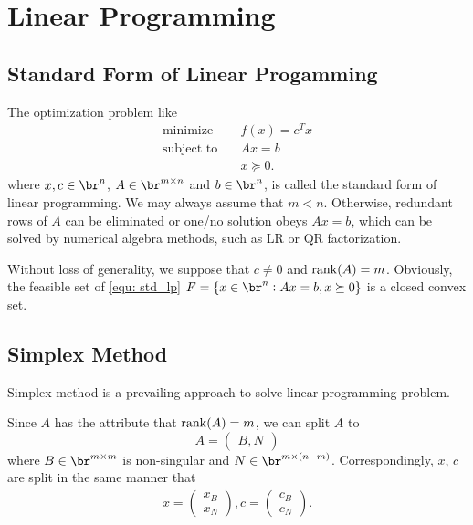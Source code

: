 \chapter{Linear Programming}
\section{Standard Form of Linear Progamming}
The optimization problem like 
\begin{equation}
    \label{equ: std_lp}
    \begin{aligned}
        \text{minimize} \quad & f(x) = c^Tx \\
        \text{subject to} \quad & Ax=b \\
        & x \succeq 0.
    \end{aligned}
\end{equation}
where $x, c \in \br ^n$, $A \in \br^{m \times n}$ and $b \in \br^n$, is 
called the standard form of linear programming. We may always assume that 
$m < n$. Otherwise, redundant rows of $A$ can be eliminated or one/no 
solution obeys $Ax = b$, which can be solved by numerical algebra methods, 
such as LR or QR factorization. 

Without loss of generality, we suppose that $c \ne 0$ and $\operatorname{rank}(A) = m$.
Obviously, the feasible set of \ref{equ: std_lp} $F=\{x \in \br^n : 
Ax = b, x \succeq 0\}$ is a closed convex set. 

\section{Simplex Method}
Simplex method is a prevailing approach to solve linear programming problem. 

Since $A$ has the attribute that $\operatorname{rank}(A) = m$, we can split $A$ to 
\begin{equation*}
    A = \begin{pmatrix}
        B, N
    \end{pmatrix}
\end{equation*}
where $B \in \br^{m \times m}$ is non-singular and 
$N \in \br^{m \times (n - m)}$. 
Correspondingly, $x$, $c$ are split in the same manner that 
\begin{align*}
    x = \begin{pmatrix}
        x_B \\
        x_N
    \end{pmatrix}, 
    c = \begin{pmatrix}
        c_B \\
        c_N
    \end{pmatrix}.
\end{align*}

